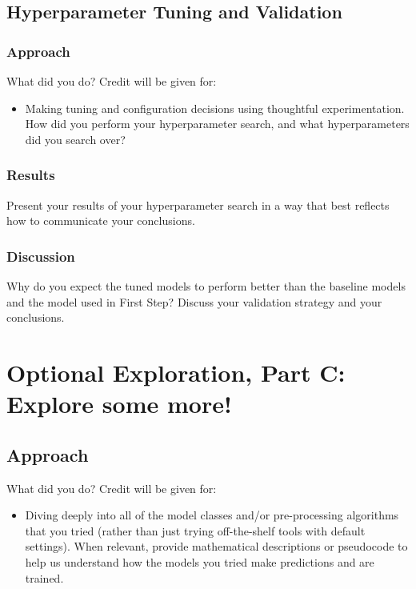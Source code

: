 \documentclass[11pt]{article}
\begin{document}
\subsection{Hyperparameter Tuning and Validation}

\subsubsection{Approach}
What did you do? Credit will be given for:

  \begin{itemize}
  \item Making tuning and configuration decisions using thoughtful experimentation.  
    How did you perform your hyperparameter search, and what hyperparameters did you search over?
  \end{itemize}

\subsubsection{Results}
Present your results of your hyperparameter search in a way that best reflects how to communicate your conclusions.

\subsubsection{Discussion}

Why do you expect the tuned models to perform better than the baseline models and the model used in First Step? Discuss your validation strategy and your conclusions.

\section{Optional Exploration, Part C: Explore some more!}
\subsection{Approach}

What did you do? Credit will be given for:
  \begin{itemize}
  \item Diving deeply into all of the model classes and/or pre-processing algorithms that you tried (rather than just trying off-the-shelf tools with default settings).  When relevant, provide mathematical descriptions or pseudocode to help us understand how the models you tried make predictions and are trained. 
  \end{itemize}
  
\end{document}

